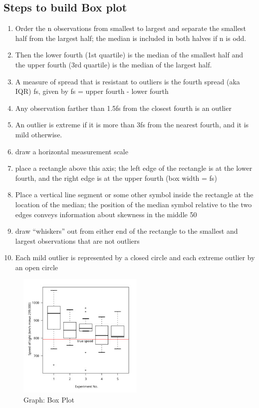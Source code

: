 \subsection{Steps to build Box plot}
\begin{enumerate}
    \item Order the n observations from smallest to largest and separate the smallest half from the largest half; the median is included in both halves if n is odd.
    \item Then the lower fourth (1st quartile) is the median of the smallest half and the upper fourth (3rd quartile) is the median of the largest half.
    \item A measure of spread that is resistant to outliers is the fourth spread (aka IQR) fs, given by fs = upper fourth - lower fourth
    \item Any observation farther than 1.5fs from the closest fourth is an outlier
    \item An outlier is extreme if it is more than 3fs from the nearest fourth, and it is mild otherwise.
    \item draw a horizontal measurement scale
    \item place a rectangle above this axis; the left edge of the rectangle is at the lower fourth, and the right edge is at the upper fourth (box width = fs)
    \item Place a vertical line segment or some other symbol inside the rectangle at the location of the median; the position of the median symbol relative to the two edges conveys information about skewness in the middle 50%
    \item draw “whiskers” out from either end of the rectangle to the smallest and largest observations that are not outliers
    \item Each mild outlier is represented by a closed circle and each extreme outlier by an open circle
\end{enumerate}

\begin{figure}[H]
    \centering
    \includegraphics[height=6cm]{Pictures/data/data_box-plot.jpg}
    \caption{Graph: Box Plot}
\end{figure}
